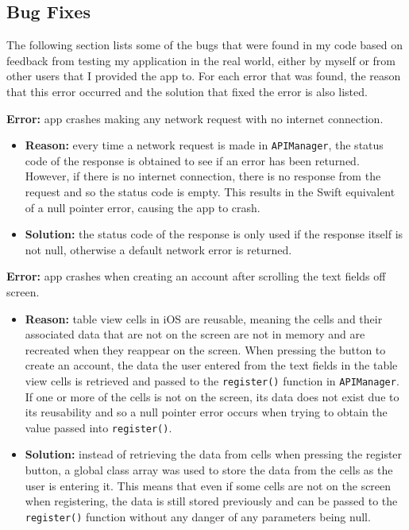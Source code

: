 \subsection{Bug Fixes}

The following section lists some of the bugs that were found in my code based on feedback from testing my application in the real world, either by myself or from other users that I provided the app to. For each error that was found, the reason that this error occurred and the solution that fixed the error is also listed.


\noindent \textbf{Error:} app crashes making any network request with no internet connection.

\begin{itemize}
  \item \textbf{Reason:} every time a network request is made in \verb|APIManager|, the status code of the response is obtained to see if an error has been returned. However, if there is no internet connection, there is no response from the request and so the status code is empty. This results in the Swift equivalent of a null pointer error, causing the app to crash.
  
  \item \textbf{Solution:} the status code of the response is only used if the response itself is not null, otherwise a default network error is returned.
\end{itemize}
  
\noindent \textbf{Error:} app crashes when creating an account after scrolling the text fields off screen.

\begin{itemize}
  \item \textbf{Reason:} table view cells in iOS are reusable, meaning the cells and their associated data that are not on the screen are not in memory and are recreated when they reappear on the screen. When pressing the button to create an account, the data the user entered from the text fields in the table view cells is retrieved and passed to the \verb|register()| function in \verb|APIManager|. If one or more of the cells is not on the screen, its data does not exist due to its reusability and so a null pointer error occurs when trying to obtain the value passed into \verb|register()|.
  
  \item \textbf{Solution:} instead of retrieving the data from cells when pressing the register button, a global class array was used to store the data from the cells as the user is entering it. This means that even if some cells are not on the screen when registering, the data is still stored previously and can be passed to the \verb|register()| function without any danger of any parameters being null.
\end{itemize}
  
